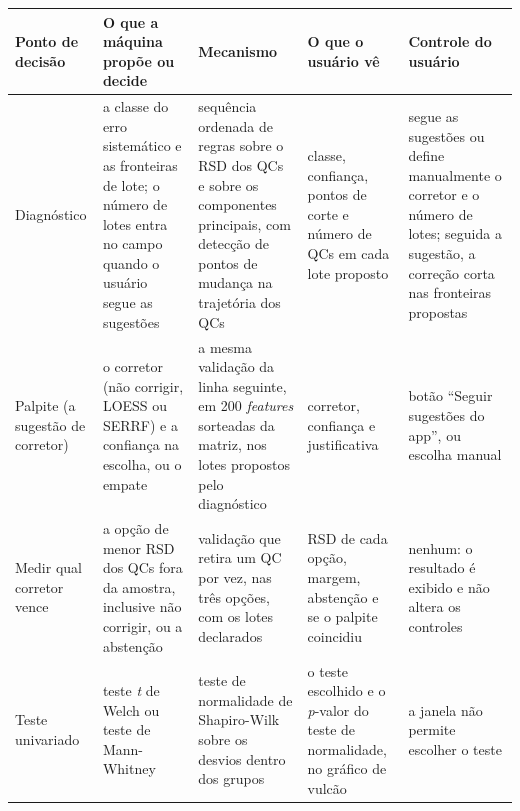 \par\medskip
\noindent\begin{minipage}{\linewidth}
  \label{quadro:ia-decisoes}
  \centering
  \footnotesize
  \setlength{\tabcolsep}{3pt}
  \begin{tabular}{|>{\raggedright\arraybackslash}p{1.9cm}|>{\raggedright\arraybackslash}p{3.0cm}|>{\raggedright\arraybackslash}p{3.1cm}|>{\raggedright\arraybackslash}p{3.0cm}|>{\raggedright\arraybackslash}p{2.7cm}|}
    \hline
    \textbf{Ponto de decisão} & \textbf{O que a máquina propõe ou decide} & \textbf{Mecanismo} & \textbf{O que o usuário vê} & \textbf{Controle do usuário} \\
    \hline
    Diagnóstico & a classe do erro sistemático e as fronteiras de lote; o número de lotes entra no campo quando o usuário segue as sugestões & sequência ordenada de regras sobre o RSD dos QCs e sobre os componentes principais, com detecção de pontos de mudança na trajetória dos QCs & classe, confiança, pontos de corte e número de QCs em cada lote proposto & segue as sugestões ou define manualmente o corretor e o número de lotes; seguida a sugestão, a correção corta nas fronteiras propostas \\
    \hline
    Palpite (a sugestão de corretor) & o corretor (não corrigir, LOESS ou SERRF) e a confiança na escolha, ou o empate & a mesma validação da linha seguinte, em 200 \emph{features} sorteadas da matriz, nos lotes propostos pelo diagnóstico & corretor, confiança e justificativa & botão ``Seguir sugestões do app'', ou escolha manual \\
    \hline
    Medir qual corretor vence & a opção de menor RSD dos QCs fora da amostra, inclusive não corrigir, ou a abstenção & validação que retira um QC por vez, nas três opções, com os lotes declarados & RSD de cada opção, margem, abstenção e se o palpite coincidiu & nenhum: o resultado é exibido e não altera os controles \\
    \hline
    Teste univariado & teste \emph{t} de Welch ou teste de Mann-Whitney & teste de normalidade de Shapiro-Wilk sobre os desvios dentro dos grupos & o teste escolhido e o \emph{p}-valor do teste de normalidade, no gráfico de vulcão & a janela não permite escolher o teste \\
    \hline
  \end{tabular}
\end{minipage}
\par\medskip

